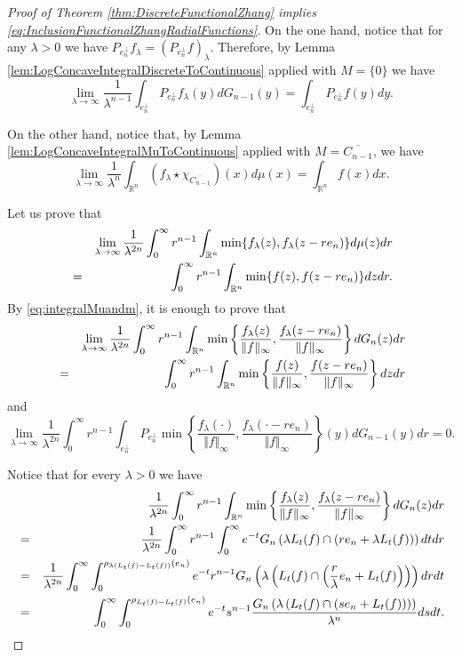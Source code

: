 \documentclass{amsart}
\newcommand{\R}{\mathbb R}
\theoremstyle{remark}
\theoremstyle{definition}
\numberwithin{equation}{section}
\begin{document}
\begin{proof}[Proof of Theorem \ref{thm:DiscreteFunctionalZhang} implies \eqref{eq:InclusionFunctionalZhangRadialFunctions}]
On the one hand, notice that for any $\lambda>0$ we have $P_{e_n^\perp}f_\lambda=(P_{e_n^\perp}f)_\lambda$. Therefore, by Lemma \ref{lem:LogConcaveIntegralDiscreteToContinuous} applied with $M=\{0\}$ we have
\begin{equation}\label{eq:limitRightHandSideDenominator}
\lim_{\lambda\to\infty}\frac{1}{\lambda^{n-1}}\int_{e_n^\perp}P_{e_n^\perp}f_\lambda(y)dG_{n-1}(y)=\int_{e_n^\perp}P_{e_n^\perp}f(y)dy.
\end{equation}

On the other hand, notice that, by Lemma \ref{lem:LogConcaveIntegralMuToContinuous} applied with $M=\overline{C_{n-1}}$, we have
\begin{equation}\label{eq:limitRightHandSideNumerator}
\lim_{\lambda\to\infty}\frac{1}{\lambda^n}\int_{\R^n}(f_\lambda\star\chi_{\overline{C_{n-1}}})(x)d\mu(x)=\int_{\R^n}f(x)dx.
\end{equation}

Let us prove that
\begin{eqnarray}\label{eq:LimitLeftHandSide}
&&\lim_{\lambda\to\infty}\frac{1}{\lambda^{2n}}\int_0^\infty r^{n-1}\int_{\R^n}\min\{f_\lambda(z),f_\lambda(z-re_n)\}d\mu(z)dr\cr
&=&\int_0^\infty r^{n-1}\int_{\R^n}\min\{f(z),f(z-re_n)\}dzdr.
\end{eqnarray}
By \eqref{eq:integralMuandm}, it is enough to prove that
\begin{eqnarray}\label{eq:LimitLeftHandSideFirstTerm}
&&\lim_{\lambda\to\infty}\frac{1}{\lambda^{2n}}\int_0^\infty r^{n-1}\int_{\R^n}\min\left\{\frac{f_\lambda(z)}{\Vert f\Vert_\infty},\frac{f_\lambda(z-re_n)}{\Vert f\Vert_\infty}\right\}dG_n(z)dr\cr
&=&\int_0^\infty r^{n-1}\int_{\R^n}\min\left\{\frac{f(z)}{\Vert f\Vert_\infty},\frac{f(z-re_n)}{\Vert f\Vert_\infty}\right\}dzdr
\end{eqnarray}
and
\begin{equation}\label{eq:LimitLeftHandSideSecondTerm}
\lim_{\lambda\to\infty}\frac{1}{\lambda^{2n}}\int_0^\infty r^{n-1}\int_{e_n^\perp}P_{e_n^\perp}\min\left\{\frac{f_\lambda(\cdot)}{\Vert f\Vert_\infty},\frac{f_\lambda(\cdot-re_n)}{\Vert f\Vert_\infty}\right\}(y)dG_{n-1}(y)dr=0.
\end{equation}

Notice that for every $\lambda>0$ we have
\begin{eqnarray*}
&&\frac{1}{\lambda^{2n}}\int_0^\infty r^{n-1}\int_{\R^n}\min\left\{\frac{f_\lambda(z)}{\Vert f\Vert_\infty},\frac{f_\lambda(z-re_n)}{\Vert f\Vert_\infty}\right\}dG_n(z)dr\cr
&=&\frac{1}{\lambda^{2n}}\int_0^\infty r^{n-1}\int_0^\infty e^{-t} G_n\left(\lambda L_t(f)\cap(re_n+\lambda L_t(f))\right)dtdr\cr
&=&\frac{1}{\lambda^{2n}}\int_0^\infty \int_0^{\rho_{\lambda(L_t(f)-L_t(f))}(e_n)}e^{-t}r^{n-1}G_n\left(\lambda\left(L_t(f)\cap\left(\frac{r}{\lambda}e_n+L_t(f)\right)\right)\right)drdt\cr
&=&\int_0^\infty \int_0^{\rho_{L_t(f)-L_t(f)}(e_n)}e^{-t}s^{n-1}\frac{G_n\left(\lambda\left(L_t(f)\cap(se_n+L_t(f))\right)\right)}{\lambda^n}dsdt.\cr
\end{eqnarray*}


\end{proof}
\end{document}
